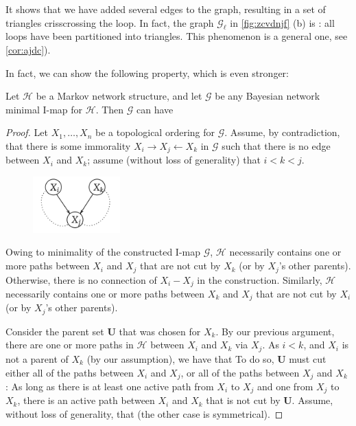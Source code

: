 \documentclass{article}
\begin{document}
\begin{rema}
It shows that we have added several edges to the graph, resulting in a set of triangles crisscrossing the loop. In fact, the graph $\mathcal{G}_{\ell}$ in \cref{fig:zcvdnjf} (b) is : all loops have been partitioned into triangles.  This phenomenon is a general one, see \cref{cor:ajdc}). 
\end{rema}
In fact, we can show the following property, which is even stronger:
\begin{thma}
Let $\mathcal{H}$ be a Markov network structure, and let $\mathcal{G}$ be any Bayesian network minimal I-map for $\mathcal{H}$. Then $\mathcal{G}$ can have 
\end{thma}
\begin{proof}
 Let $X_{1}, \ldots, X_{n}$ be a topological ordering for $\mathcal{G}$. Assume, by contradiction, that there is some immorality $X_{i} \rightarrow X_{j} \leftarrow X_{k}$ in $\mathcal{G}$ such that there is no edge between $X_{i}$ and $X_{k}$; assume (without loss of generality) that $i<k<j$.
\begin{figure}[H]
    \centering
    \includegraphics[width=0.3\textwidth]{Figs/a13.png}
    \end{figure}
Owing to minimality of the constructed I-map $\mathcal{G}$, $\mathcal{H}$ necessarily contains one or more paths between $X_{i}$ and $X_{j}$ that are not cut by $X_{k}$ (or by $X_{j}$'s other parents). Otherwise, there is no connection of $X_i-X_{j}$ in the construction.
Similarly, $\mathcal{H}$ necessarily contains one or more paths between $X_{k}$ and $X_{j}$ that are not cut by $X_{i}$ (or by $X_{j}$'s other parents).

Consider the parent set $\boldsymbol{U}$ that was chosen for $X_{k}$. By our previous argument, there are one or more paths in $\mathcal{H}$ between $X_{i}$ and $X_{k}$ via $X_{j}$. As $i<k$, and $X_{i}$ is not a parent of $X_{k}$ (by our assumption), we have that  To do so, $\boldsymbol{U}$ must cut either all of the paths between $X_{i}$ and $X_{j}$, or all of the paths between $X_{j}$ and $X_{k}$ : As long as there is at least one active path from $X_{i}$ to $X_{j}$ and one from $X_{j}$ to $X_{k}$, there is an active path between $X_{i}$ and $X_{k}$ that is not cut by $\boldsymbol{U}$. Assume, without loss of generality, that  (the other case is symmetrical).


\end{proof}
\end{document}
